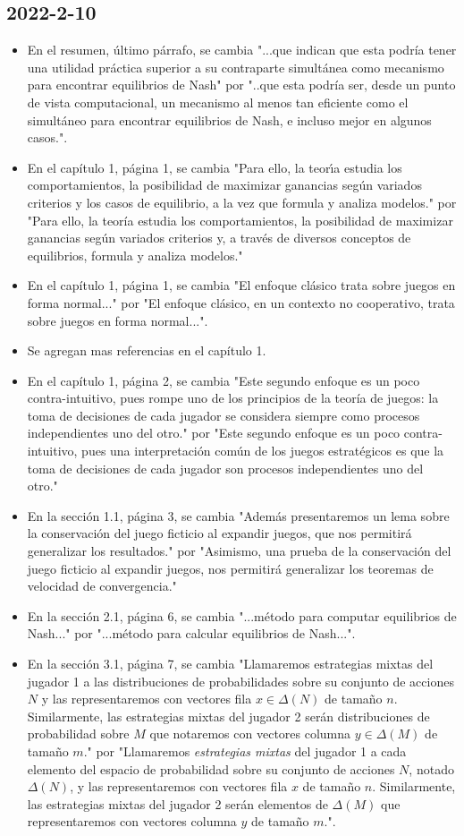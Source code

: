 \documentclass{article}
\begin{document}
\subsection*{2022-2-10}
\begin{itemize}
    \item En el resumen, último párrafo, se cambia "...que indican que esta podría tener una utilidad práctica superior a su contraparte simultánea como mecanismo para encontrar equilibrios de Nash" por "..que esta podría ser, desde un punto de vista computacional, un mecanismo al menos tan eficiente como el simultáneo para encontrar equilibrios de Nash, e incluso mejor en algunos casos.".
    \item En el capítulo 1, página 1, se cambia "Para ello, la teorı́a estudia los comportamientos, la posibilidad de maximizar ganancias según variados criterios y los
    casos de equilibrio, a la vez que formula y analiza modelos." por "Para ello, la teoría estudia los comportamientos, la posibilidad de maximizar ganancias según variados criterios y, a través de diversos conceptos de equilibrios, formula y analiza modelos."
    \item En el capítulo 1, página 1, se cambia "El enfoque clásico trata sobre juegos en forma normal..." por "El enfoque clásico, en un contexto no cooperativo, trata sobre juegos en forma normal...".
    \item Se agregan mas referencias en el capítulo 1.
    \item En el capítulo 1, página 2, se cambia "Este segundo enfoque es un poco contra-intuitivo, pues rompe uno de los principios de la teoría de juegos: la toma de decisiones de cada jugador se considera siempre como procesos independientes uno del otro." por "Este segundo enfoque es un poco contra-intuitivo, pues una interpretación común de los juegos estratégicos es que la toma de decisiones de cada jugador son procesos independientes uno del otro."
    \item En la sección 1.1, página 3, se cambia "Además presentaremos un lema sobre la conservación del juego ficticio al expandir juegos, que nos permitirá generalizar los resultados." por "Asimismo, una prueba de la conservación del juego ficticio al expandir juegos, nos permitirá generalizar los teoremas de velocidad de convergencia."
    \item En la sección 2.1, página 6, se cambia "...método para computar equilibrios de Nash..." por "...método para calcular equilibrios de Nash...".
    \item En la sección 3.1, página 7, se cambia "Llamaremos estrategias mixtas del jugador 1 a las distribuciones de probabilidades sobre su conjunto de acciones $N$ y las representaremos con vectores fila $x \in \Delta(N)$ de tamaño $n$. Similarmente, las estrategias mixtas del jugador 2 serán distribuciones de probabilidad sobre $M$ que notaremos con vectores columna $y \in \Delta(M)$ de tamaño $m$." por "Llamaremos \emph{estrategias mixtas} del jugador 1 a cada elemento del espacio de probabilidad sobre su conjunto de acciones $N$, notado $\Delta(N)$, y las representaremos con vectores fila $x$ de tamaño $n$. Similarmente, las estrategias mixtas del jugador 2 serán elementos de $\Delta(M)$ que representaremos con vectores columna $y$ de tamaño $m$.".

\end{itemize}
\end{document}
